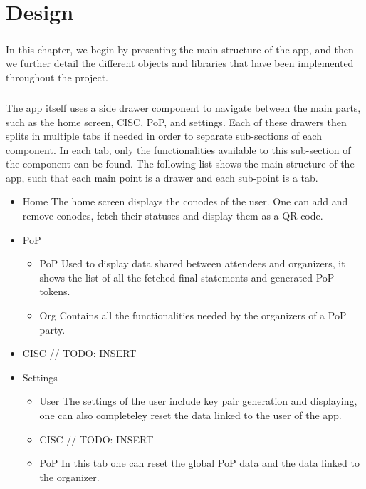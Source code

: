 \chapter{Design}
\paragraph{}
In this chapter, we begin by presenting the main structure of the app, and then we further detail the different objects and libraries that have been implemented throughout the project.

\paragraph{}
The app itself uses a side drawer component to navigate between the main parts, such as the home screen, CISC, PoP, and settings. Each of these drawers then splits in multiple tabs if needed in order to separate sub-sections of each component. In each tab, only the functionalities available to this sub-section of the component can be found. The following list shows the main structure of the app, such that each main point is a drawer and each sub-point is a tab.

\begin{itemize}
\item Home \linebreak The home screen displays the conodes of the user. One can add and remove conodes, fetch their statuses and display them as a QR code.

\item PoP
\begin{itemize}
\item PoP \linebreak Used to display data shared between attendees and organizers, it shows the list of all the fetched final statements and generated PoP tokens.

\item Org \linebreak Contains all the functionalities needed by the organizers of a PoP party.
\end{itemize}

\item CISC // TODO: INSERT

\item Settings
\begin{itemize}
\item User \linebreak The settings of the user include key pair generation and displaying, one can also completeley reset the data linked to the user of the app.

\item CISC // TODO: INSERT

\item PoP \linebreak In this tab one can reset the global PoP data and the data linked to the organizer.
\end{itemize}
\end{itemize}

